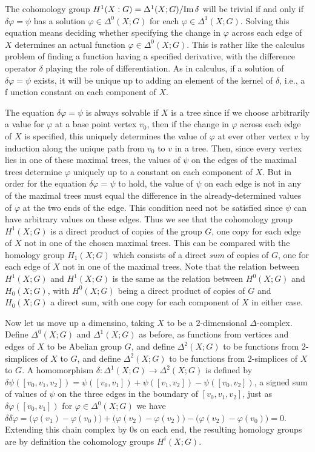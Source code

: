 The cohomology group \(H^1(X:G)=\Delta^1(X;G)/{\operatorname{Im}\delta}\) will be
trivial if and only if \(\delta\varphi=\psi\) has a solution
\(\varphi\in\Delta^0(X;G)\) for each \(\varphi\in\Delta^1(X;G)\). Solving
this equation means deciding whether specifying the change in \(\varphi\)
across each edge of \(X\) determines an actual function
\(\varphi\in\Delta^0(X;G)\). This is rather like the calculus problem of
finding a function having a specified derivative, with the difference
operator \(\delta\) playing the role of differentiation. As in calculus, if
a solution of \(\delta\varphi=\psi\) exists, it will be unique up to adding
an element of the kernel of \(\delta\), i.e., a f unction constant on each
component of \(X\).

The equation \(\delta\varphi=\psi\) is always solvable if \(X\) is a tree
since if we choose arbitrarily a value for \(\varphi\) at a base point
vertex \(v_0\), then if the change in \(\varphi\) across each edge of \(X\)
is specified, this uniquely determines the value of \(\varphi\) at ever
other vertex \(v\) by induction along the unique path from \(v_0\) to \(v\)
in a tree. Then, since every vertex lies in one of these maximal trees, the
values of \(\psi\) on the edges of the maximal trees determine \(\varphi\)
uniquely up to a constant on each component of \(X\). But in order for the
equation \(\delta\varphi=\psi\) to hold, the value of \(\psi\) on each edge
is not in any of the maximal trees must equal the difference in the
already-determined values of \(\varphi\) at the two ends of the edge. This
condition need not be satisfied since \(\psi\) can have arbitrary values on
these edges. Thus we see that the cohomology group \(H^1(X;G)\) is a direct
product of copies of the group \(G\), one copy for each edge of \(X\) not
in one of the chosen maximal trees. This can be compared with the homology
group \(H_1(X;G)\) which consists of a direct \emph{sum} of copies of
\(G\), one for each edge of \(X\) not in one of the maximal trees. Note
that the relation between \(H^1(X;G)\) and \(H^1(X;G)\) is the same as the
relation between \(H^0(X;G)\) and \(H_0(X;G)\), with \(H^0(X;G)\) being a
direct product of copies of \(G\) and \(H_0(X;G)\) a direct sum, with one
copy for each component of \(X\) in either case.

Now let us move up a dimensino, taking \(X\) to be a \(2\)-dimensional
\(\Delta\)-complex. Define \(\Delta^0(X;G)\) and \(\Delta^1(X;G)\) as
before, as functions from vertices and edges of \(X\) to be Abelian group
\(G\), and define \(\Delta^2(X;G)\) to be functions from \(2\)-simplices of
\(X\) to \(G\), and define \(\Delta^2(X;G)\) to be functions from
\(2\)-simplices of \(X\) to \(G\). A homomorphism
\(\delta\colon\Delta^1(X;G)\to\Delta^2(X;G)\) is defined by
\(\delta\psi([v_0,v_1,v_2])=\psi([v_0,v_1])+\psi([v_1,v_2])-\psi([v_0,v_2])\),
a signed sum of values of \(\psi\) on the three edges in the boundary of
\([v_0,v_1,v_2]\), just as \(\delta\varphi([v_0,v_1])\) for
\(\varphi\in\Delta^0(X;G)\) we have
\(\delta\delta\varphi=\bigl(\varphi(v_1)-\varphi(v_0)\bigr)+\bigl(\varphi(v_2)-\varphi(v_2)\bigr)-\bigl(\varphi(v_2)-\varphi(v_0)\bigr)=0\). Extending
this chain complex by \(0\)s on each end, the resulting homology groups are
by definition the cohomology groups \(H^i(X;G)\).

